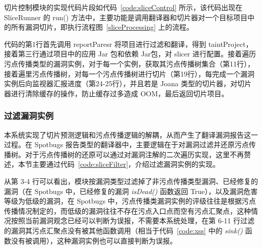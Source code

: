 切片控制模块的实现代码片段如代码~\ref{code:sliceControl} 所示，该代码出现在 SliceRunner 的 run() 方法中，主要功能是调用翻译器和切片器对一个目标项目中的所有漏洞切片，即执行流程图~\ref{sliceProcessing} 上的流程。

代码的第1行首先调用 reportParesr 将项目进行过滤和翻译，得到 taintProject， 接着第三行通过项目中的应用 Jar 包和依赖 Jar包，对 slicer 进行配置。接着遍历污点传播类型的漏洞实例，对于每一个实例，获取其污点传播树集合（第11行），接着遍里污点传播树，对每一个污点传播树进行切片（第19行），每完成一个漏洞实例后向监视器汇报进度（第24-25行），并且若是 Joana 类型的切片器，对切片器进行清除缓存的操作，防止缓存过多造成 OOM，最后返回切片项目。\\

\vspace{-0.7cm}
\begin{minipage}[!htbp]{0.9\textwidth}
    
\end{minipage}
\vspace{0.7cm}

\subsubsection{过滤漏洞实例}
本系统实现了切片预测逻辑和污点传播逻辑的解耦，从而产生了翻译漏洞报告这一过程。在 Spotbugs 报告类型的翻译器中，主要逻辑在于对漏洞过滤并还原污点传播树。对于污点传播树的还原可以通过对漏洞注解的二次遍历实现，这里不再赘述，本节主要通过代码~\ref{code:sliceFilter}，介绍过滤漏洞实例的实现。

\begin{minipage}[!htbp]{0.9\textwidth}
    
\end{minipage}

从第 3-4 行可以看出，模块按漏洞类型过滤掉了非污点传播类型漏洞、已经修复的漏洞（在 Spotbugs 中，已经修复的漏洞 \textit{isDead()} 函数返回 True），以及漏洞危害等级为低级的漏洞，在 Spotbugs 中，污点传播类漏洞实例的评级往往是根据污点传播情况制定的，而低级的漏洞往往不存在污点入口点而空有污点汇聚点，这种情况按照当前漏洞观念已经可以判断为误报，不需要本系统处理，在第 6-11 行过滤的漏洞其污点汇聚点没有被其他函数调用（相当于代码~\ref{code:xss} 中的 \textit{sink()} 函数没有被调用），这种漏洞实例也可以直接判断为误报。

\begin{minipage}[!htbp]{0.9\textwidth}
    
\end{minipage}

